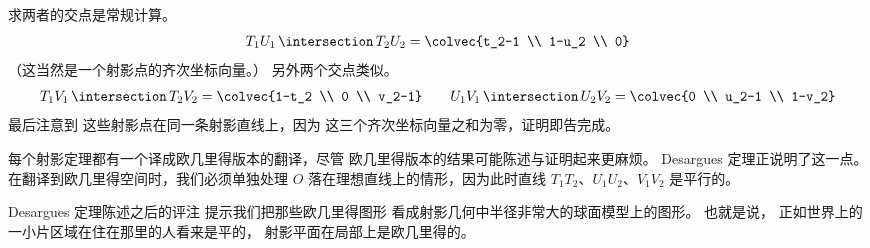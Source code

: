 求两者的交点是常规计算。
\begin{equation*}
  T_1U_1\,\intersection\, T_2U_2
  =\colvec{t_2-1 \\ 1-u_2 \\ 0}
\end{equation*}
（这当然是一个射影点的齐次坐标向量。）
另外两个交点类似。
\begin{equation*}
  T_1V_1\,\intersection\, T_2V_2
  =\colvec{1-t_2 \\ 0 \\ v_2-1}
  \qquad
  U_1V_1\,\intersection\, U_2V_2
  =\colvec{0 \\ u_2-1 \\ 1-v_2}
\end{equation*}
最后注意到
这些射影点在同一条射影直线上，因为
这三个齐次坐标向量之和为零，证明即告完成。

每个射影定理都有一个译成欧几里得版本的翻译，尽管
欧几里得版本的结果可能陈述与证明起来更麻烦。
Desargues 定理正说明了这一点。
在翻译到欧几里得空间时，我们必须单独处理
$O$ 落在理想直线上的情形，因为此时直线
$T_1T_2$、$U_1U_2$、$V_1V_2$ 是平行的。

Desargues 定理陈述之后的评注
提示我们把那些欧几里得图形
看成射影几何中半径非常大的球面模型上的图形。
也就是说，
正如世界上的一小片区域在住在那里的人看来是平的，
射影平面在局部上是欧几里得的。

